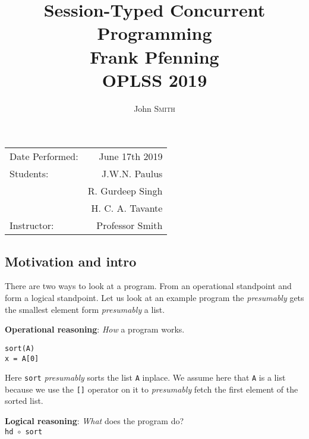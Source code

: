 \documentclass{article}
\title{Session-Typed Concurrent Programming \\ Frank Pfenning \\ OPLSS 2019} %
\author{John \textsc{Smith}} %
\begin{document}
\maketitle %

\begin{center}
\begin{tabular}{l r}
Date Performed: & June 17th 2019 \\ %
Students: & J.W.N. Paulus  \\
& R. Gurdeep Singh \\ %
& H. C. A. Tavante \\
Instructor: & Professor Smith %
\end{tabular}
\end{center}





\subsection*{Motivation and intro}

There are two ways to look at a program. From an operational standpoint
and form a logical standpoint. Let us look at an example program the
\emph{presumably} gets the smallest element form \emph{presumably} a
list.

\textbf{Operational reasoning}: \emph{How} a program works.

\begin{verbatim}
sort(A)
x = A[0]
\end{verbatim}

Here \texttt{sort} \emph{presumably} sorts the list \texttt{A} inplace.
We assume here that \texttt{A} is a list because we use the
\texttt{{[}{]}} operator on it to \emph{presumably} fetch the first
element of the sorted list.

\textbf{Logical reasoning}: \emph{What} does the program do?\\

\verb|hd |\(\circ\)\verb| sort| \\
\end{document}

